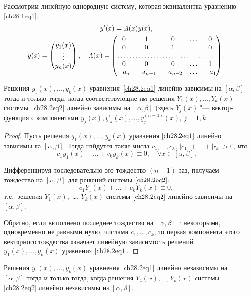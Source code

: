 Рассмотрим линейную однородную систему, которая эквивалентна уравнению \eqref{ch28.1eq1}:
\begin{multline} \label{ch28.2eq2}
y'(x) = A(x)y(x), \\
y(x) = \begin{pmatrix}
y_1(x) \\
\vdots \\
y_n(x)
\end{pmatrix},\quad
A(x) = \begin{pmatrix}
0 & 1 & 0 & \ldots & 0 \\
0 & 0 & 1 & \ldots & 0 \\
\hdotsfor{5} \\
0 & 0 & 0 & \ldots & 1 \\
-a_n & -a_{n - 1} & -a_{n - 2} & \ldots & -a_1
\end{pmatrix}.
\end{multline}

\begin{lemm} \label{ch28.2lemm1}
Решения $y_1(x), \ldots, y_k(x)$ уравнения~\eqref{ch28.2eq1} линейно зависимы на $[\alpha, \beta]$ тогда и только тогда, когда соответствующие им решения $Y_1(x), \ldots, Y_k(x)$ системы~\eqref{ch28.2eq2} линейно зависимы на $[\alpha,\beta]$ (здесь $Y_j(x)$ "--- вектор-функция с компонентами $y_j(x), y'_j(x), \ldots, y^{(n - 1)}_j(x), \ j = \overline{1,k}$.
\end{lemm}

\begin{proof}
Пусть решения $y_1(x), \ldots, y_k(x)$ уравнения $\eqref{ch28.2eq1}$ линейно зависимы на $[\alpha, \beta]$. Тогда найдутся такие числа $c_1, \ldots, c_k, \: |c_1| + \ldots + |c_k| > 0$, что 
$$
c_1y_1(x) + \ldots + c_ky_k(x) \equiv 0, \quad \forall x \in [\alpha, \beta].
$$

Дифференцируя последовательно это тождество $(n - 1)$ раз, получаем тождество на $[\alpha, \beta]$ для решений системы $\eqref{ch28.2eq2}$:
$$
c_1Y_1(x) + \ldots + c_kY_k(x) \equiv 0,
$$
т.е.~решения $Y_1(x)$,~\dots, $Y_k(x)$ системы $\eqref{ch28.2eq2}$ линейно зависимы на $[\alpha, \beta]$.

Обратно, если выполнено последнее тождество на $[\alpha, \beta]$ с некоторыми, одновременно не равными нулю, числами $c_1, \ldots, c_k$, то первая компонента этого векторного тождества означает линейную зависимость решений $y_1(x), \ldots, y_k(x)$ уравнения $\eqref{ch28.2eq1}.$
\end{proof}

\begin{cons}
Решения $y_1(x), \ldots, y_k(x)$ уравнения \eqref{ch28.2eq1} линейно независимы на $[\alpha, \beta]$ тогда и только тогда, когда решения $Y_1(x), \ldots, Y_k(x)$ системы \eqref{ch28.2eq2} линейно независимы на $[\alpha, \beta]$.
\end{cons}


